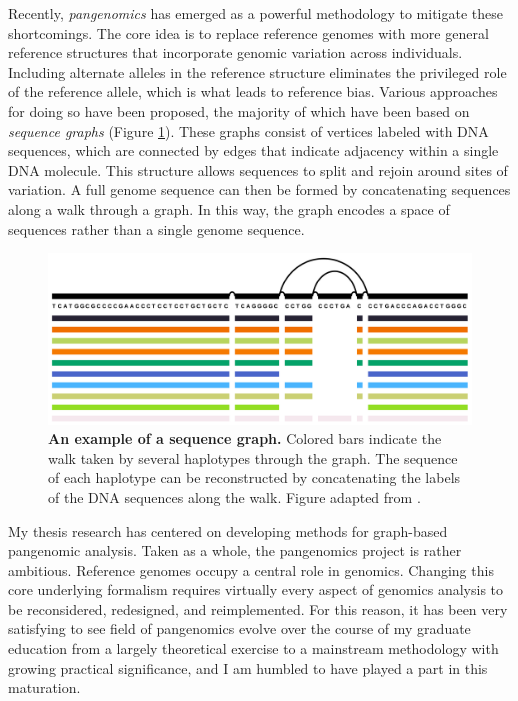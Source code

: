 \documentclass[11pt]{ucthesis}
\begin{document}
Recently, \emph{pangenomics} has emerged as a powerful methodology to mitigate these shortcomings. The core idea is to replace reference genomes with more general reference structures that incorporate genomic variation across individuals. Including alternate alleles in the reference structure eliminates the privileged role of the reference allele, which is what leads to reference bias. Various approaches for doing so have been proposed, the majority of which have been based on \emph{sequence graphs} (Figure \ref{fig:graph_example}). These graphs consist of vertices labeled with DNA sequences, which are connected by edges that indicate adjacency within a single DNA molecule. This structure allows sequences to split and rejoin around sites of variation. A full genome sequence can then be formed by concatenating sequences along a walk through a graph. In this way, the graph encodes a space of sequences rather than a single genome sequence.

\begin{figure}[h]
\begin{center}
\includegraphics[width=.75\textwidth]{introfigures/pangenome_graph.png}
\caption{\textbf{An example of a sequence graph.} Colored bars indicate the walk taken by several haplotypes through the graph. The sequence of each haplotype can be reconstructed by concatenating the labels of the DNA sequences along the walk. Figure adapted from \cite{Garrison_2019}.
} \label{fig:graph_example}
\end{center}
\end{figure}

My thesis research has centered on developing methods for graph-based pangenomic analysis. Taken as a whole, the pangenomics project is rather ambitious. Reference genomes occupy a central role in genomics. Changing this core underlying formalism requires virtually every aspect of genomics analysis to be reconsidered, redesigned, and reimplemented. For this reason, it has been very satisfying to see field of pangenomics evolve over the course of my graduate education from a largely theoretical exercise to a mainstream methodology with growing practical significance, and I am humbled to have played a part in this maturation.
\end{document}
